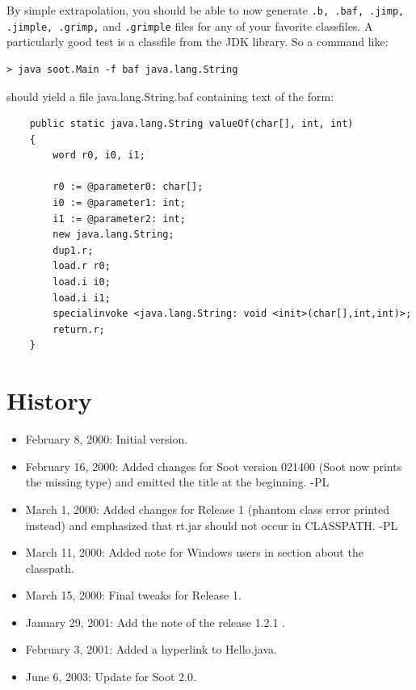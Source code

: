 \documentclass{article}
\begin{document}
By simple extrapolation, you should be able to now generate {\tt .b, .baf,
.jimp, .jimple, .grimp,} and {\tt .grimple} files for any of your favorite
classfiles.  A particularly good test is a classfile from the JDK
library.  So a command like:

\begin{verbatim}
> java soot.Main -f baf java.lang.String
\end{verbatim}

should yield a file java.lang.String.baf containing text of the form:

\begin{verbatim}
    public static java.lang.String valueOf(char[], int, int)
    {
        word r0, i0, i1;

        r0 := @parameter0: char[];
        i0 := @parameter1: int;
        i1 := @parameter2: int;
        new java.lang.String;
        dup1.r;
        load.r r0;
        load.i i0;
        load.i i1;
        specialinvoke <java.lang.String: void <init>(char[],int,int)>;
        return.r;
    }
\end{verbatim}

\section{History}
\begin{itemize}
\item February 8, 2000: Initial version.

\item February 16, 2000: Added changes for Soot version 021400 (Soot now prints
the missing type) and emitted the title at the beginning. -PL

\item March 1, 2000: Added changes for Release 1 (phantom class error
printed instead) and emphasized that rt.jar should not occur in CLASSPATH. -PL

\item March 11, 2000: Added note for Windows users in section about the
classpath.

\item March 15, 2000: Final tweaks for Release 1.

\item January 29, 2001: Add the note of the release 1.2.1 .

\item February 3, 2001: Added a hyperlink to Hello.java.

\item June 6, 2003: Update for Soot 2.0.
\end{itemize}
\end{document}
